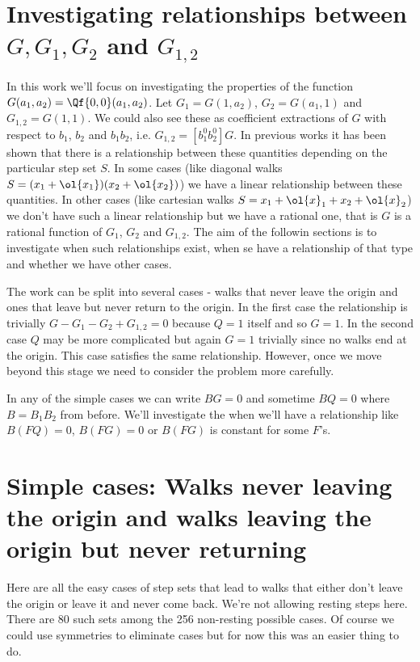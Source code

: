 \section{Investigating relationships between $G,G_1,G_2$ and $G_{1,2}$}

In this work we'll focus on investigating the properties of the function $G(a_1,a_2) = \Qf{0,0}(a_1,a_2)$. Let $G_1 = G(1,a_2)$, $G_2 = G(a_1,1)$ and $G_{1,2} = G(1,1)$. We could also see these as coefficient extractions of $G$ with respect to $b_1$, $b_2$ and $b_1b_2$, i.e. $G_{1,2} = [b_1^0b_2^0] G$. In previous works it has been shown that there is a relationship between these quantities depending on the particular step set $S$. In some cases (like diagonal walks $S = (x_1+\ol{x_1})(x_2+\ol{x_2})$) we have a linear relationship between these quantities. In other cases (like cartesian walks $S = x_1 +\ol{x}_1 + x_2 + \ol{x}_2$) we don't have such a linear relationship but we have a rational one, that is $G$ is a rational function of $G_1$, $G_2$ and $G_{1,2}$. The aim of the followin sections is to investigate when such relationships exist, when se have a relationship of that type and whether we have other cases.

The work can be split into several cases - walks that never leave the origin and ones that leave but never return to the origin. In the first case the relationship is trivially $G-G_1 - G_2 + G_{1,2} = 0$ because $Q = 1$ itself and so $G = 1$. In the second case $Q$ may be more complicated but again $G = 1$ trivially since no walks end at the origin. This case satisfies the same relationship. However, once we move beyond this stage we need to consider the problem more carefully.

In any of the simple cases we can write $BG = 0$ and sometime $BQ = 0$ where $B = B_1 B_2$ from before. We'll investigate the when we'll have a relationship like $B(FQ) = 0$, $B(FG) = 0$ or $B(FG)$ is constant for some $F$'s.

\section{Simple cases: Walks never leaving the origin and walks leaving the origin but never returning}
Here are all the easy cases of step sets that lead to walks that either don't leave the origin or leave it and never come back. We're not allowing resting steps here. There are 80 such sets among the 256 non-resting possible cases. Of course we could use symmetries to eliminate cases but for now this was an easier thing to do.

